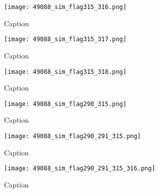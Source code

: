 \documentclass[12pt]{article}
\begin{document}
\begin{figure}[p]
	\centering
	\texttt{[image: 49088\_sim\_flag315\_316.png]}
	\caption[Model power spectrum calculated with flagged time integrations and two contiguous flagged channels]{Caption}
	\label{fig:sim_flag_chan315_316}
\end{figure}

\begin{figure}[p]
	\centering
	\texttt{[image: 49088\_sim\_flag315\_317.png]}
	\caption[Model power spectrum calculated with flagged time integrations and three contiguous flagged channels]{Caption}
	\label{fig:sim_flag_chan315_317}
\end{figure}

\begin{figure}[p]
	\centering
	\texttt{[image: 49088\_sim\_flag315\_318.png]}
	\caption[Model power spectrum calculated with flagged time integrations and four contiguous flagged channels]{Caption}
	\label{fig:sim_flag_chan315_318}
\end{figure}

\begin{figure}[p]
	\centering
	\texttt{[image: 49088\_sim\_flag290\_315.png]}
	\caption[Model power spectrum calculated with flagged time integrations and two non-contiguous flagged channels]{Caption}
	\label{fig:sim_flag_chan290_315}
\end{figure}

\begin{figure}[p]
	\centering
	\texttt{[image: 49088\_sim\_flag290\_291\_315.png]}
	\caption[Model power spectrum calculated with flagged time integrations and three flagged channels (two contiguous, one not)]{Caption}
	\label{fig:sim_flag_chan290_291_315}
\end{figure}

\begin{figure}[p]
	\centering
	\texttt{[image: 49088\_sim\_flag290\_291\_315\_316.png]}
	\caption[Model power spectrum calculated with flagged time integrations and four flagged channels (two blocks of two channels)]{Caption}
	\label{fig:sim_flag_chan290_291_315_316}
\end{figure}
\end{document}
